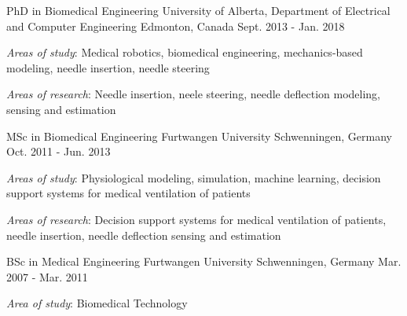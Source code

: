 

\begin{cventries}

  \cventry
    {PhD in Biomedical Engineering} %
    {University of Alberta, Department of Electrical and Computer Engineering} %
    {Edmonton, Canada} %
    {Sept. 2013 - Jan. 2018} %
    {
      \begin{cvitems} %
        \item {\emph{Areas of study}: Medical robotics, biomedical engineering, mechanics-based modeling, needle insertion, needle steering}
        \item {\emph{Areas of research}: Needle insertion, neele steering, needle deflection modeling,  sensing and estimation}
      \end{cvitems}
    }

  \cventry
    {MSc in Biomedical Engineering} %
    {Furtwangen University} %
    {Schwenningen, Germany} %
    {Oct. 2011 - Jun. 2013} %
    {
      \begin{cvitems} %
        \item {\emph{Areas of study}: Physiological modeling, simulation, machine learning, decision support systems for medical ventilation of patients}
        \item {\emph{Areas of research}}: Decision support systems for medical ventilation of patients, needle insertion, needle deflection sensing and estimation
      \end{cvitems}
    }

  \cventry
    {BSc in Medical Engineering} %
    {Furtwangen University} %
    {Schwenningen, Germany} %
    {Mar. 2007 - Mar. 2011} %
    {
      \begin{cvitems} %
        \item {\emph{Area of study}: Biomedical Technology}
      \end{cvitems}
    }

\end{cventries}
